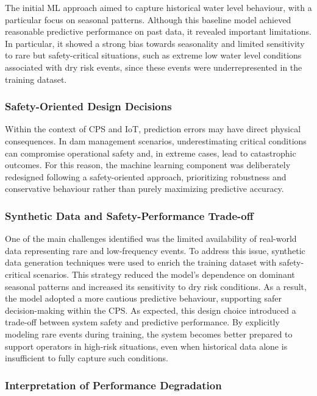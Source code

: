 The initial ML approach aimed to capture historical water level behaviour, with a particular focus on seasonal patterns. Although this baseline model achieved reasonable predictive performance on past data, it revealed important limitations. In particular, it showed a strong bias towards seasonality and limited sensitivity to rare but safety-critical situations, such as extreme low water level conditions associated with dry risk events, since these events were underrepresented in the training dataset.

\subsubsection{Safety-Oriented Design Decisions}

Within the context of CPS and IoT, prediction errors may have direct physical consequences. In dam management scenarios, underestimating critical conditions can compromise operational safety and, in extreme cases, lead to catastrophic outcomes. For this reason, the machine learning component was deliberately redesigned following a safety-oriented approach, prioritizing robustness and conservative behaviour rather than purely maximizing predictive accuracy.

\subsubsection{Synthetic Data and Safety-Performance Trade-off}

One of the main challenges identified was the limited availability of real-world data representing rare and low-frequency events. To address this issue, synthetic data generation techniques were used to enrich the training dataset with safety-critical scenarios. This strategy reduced the model's dependence on dominant seasonal patterns and increased its sensitivity to dry risk conditions. As a result, the model adopted a more cautious predictive behaviour, supporting safer decision-making within the CPS. As expected, this design choice introduced a trade-off between system safety and predictive performance. By explicitly modeling rare events during training, the system becomes better prepared to support operators in high-risk situations, even when historical data alone is insufficient to fully capture such conditions.

\subsubsection{Interpretation of Performance Degradation}


